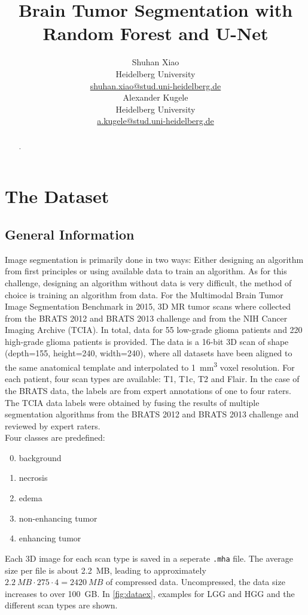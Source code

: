 \documentclass[final]{article}
\title{Brain Tumor Segmentation with Random Forest and U-Net}
\author{
  Shuhan Xiao \\
  Heidelberg University \\
  \href{mailto:shuhan.xiao@stud.uni-heidelberg.de}{shuhan.xiao@stud.uni-heidelberg.de}\\
  \And
  Alexander Kugele \\
  Heidelberg University \\
  \href{mailto:a.kugele@stud.uni-heidelberg.de}{a.kugele@stud.uni-heidelberg.de}\\
}
\begin{document}
\maketitle

\begin{abstract}
.
\end{abstract}

\section{The Dataset}

\subsection{General Information}
Image segmentation is primarily done in two ways: Either designing an algorithm
from first principles or using available data to train an algorithm. As for
this challenge, designing an algorithm without data is very difficult, the
method of choice is training an algorithm from data. For the Multimodal Brain
Tumor Image Segmentation Benchmark \citep{BRATS} in 2015, 3D MR tumor scans
where collected from the BRATS 2012 and BRATS 2013 challenge and from the NIH
Cancer Imaging Archive (TCIA). In total, data for 55 low-grade glioma patients
and 220 high-grade glioma patients is provided. The data is a 16-bit 3D scan of
shape (depth=155, height=240, width=240), where all datasets have been aligned
to the same anatomical template and interpolated to \SI{1}{\mm^3} voxel
resolution. For each patient, four scan types are available: T1, T1c, T2 and
Flair. In the case of the BRATS data, the labels are from expert annotations of
one to four raters. The TCIA data labels were obtained by fusing the results of
multiple segmentation algorithms from the BRATS 2012 and BRATS 2013 challenge
and reviewed by expert raters.\\
Four classes are predefined:
\begin{enumerate}[label=\arabic*),topsep=0pt]
  \setcounter{enumi}{-1}
\item background
\item necrosis
\item edema
\item non-enhancing tumor
\item enhancing tumor
\end{enumerate}
Each 3D image for each scan type is saved in a seperate \verb+.mha+ file. The
average size per file is about \SI{2.2}{MB}, leading to approximately
$\SI{2.2}{MB}\cdot 275 \cdot 4 = \SI{2420}{MB}$ of compressed data.
Uncompressed, the data size increases to over \SI{100}{GB}. In
\cref{fig:dataex}, examples for LGG and HGG and the different scan types are
shown.
\end{document}
